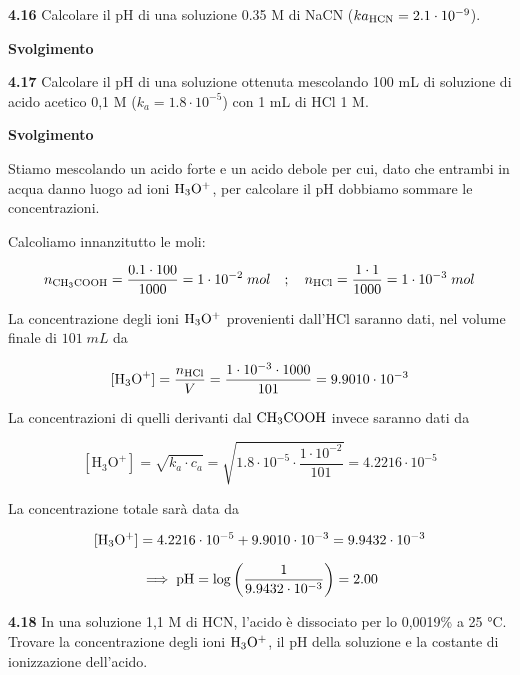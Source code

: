 \vspace{0.2cm}

\vspace{0.2cm}\textbf{4.16} Calcolare il pH di una soluzione 0.35 M di NaCN ($k{a_{\rm HCN}} = 2.1 \cdot 10^{-9}$).

\vspace{0.2cm}\large\textbf{Svolgimento}\normalsize

\vspace{0.2cm}

\vspace{0.2cm}\textbf{4.17} Calcolare il pH di una soluzione ottenuta mescolando 100 mL di soluzione di acido acetico 0,1 M ($k_a=1.8 \cdot 10^{-5}$) con 1 mL di HCl 1 M.

\vspace{0.2cm}\large\textbf{Svolgimento}\normalsize

\vspace{0.2cm}Stiamo mescolando un acido forte e un acido debole per cui, dato che entrambi in acqua danno luogo ad ioni $\rm H_3O^+$, per calcolare il pH dobbiamo sommare le concentrazioni.

Calcoliamo innanzitutto le moli:

$$n_{\rm CH_3COOH}=\frac{0.1 \cdot 100}{1000}=1 \cdot 10^{-2}\;mol
\quad;\quad
n_{\rm HCl}=\frac{1 \cdot 1}{1000}=1 \cdot 10^{-3}\;mol$$

La concentrazione degli ioni $\rm H_3O^+$ provenienti dall'HCl saranno dati, nel volume finale di $101\;mL$ da

$$[\text{H}_3\text{O}^+]=\frac{n_{\rm HCl}}{V}
=\frac{1 \cdot 10^{-3} \cdot 1000}{101}
=9.9010\cdot 10^{-3}$$

La concentrazioni di quelli derivanti dal $\rm CH_3COOH$ invece saranno dati da

$$[\text{H}_3\text{O}^+]=\sqrt{k_a \cdot c_a}
=\sqrt{1.8 \cdot 10^{-5}\cdot \frac{1 \cdot 10^{-2}}{101}}
=4.2216 \cdot 10^{-5}$$

La concentrazione totale sarà data da

$$[\rm H_3O^+]=4.2216 \cdot 10^{-5} + 9.9010\cdot 10^{-3}=9.9432 \cdot 10^{-3}$$

$$\implies
\rm pH=\log{\left(\frac{1}{9.9432 \cdot 10^{-3}}\right)}
=2.00$$

\vspace{0.2cm}\textbf{4.18}  In una soluzione 1,1 M di HCN, l'acido è dissociato per lo 0,0019\% a 25 °C. Trovare la concentrazione degli ioni $\rm H_3O^+$, il pH della soluzione e la costante di ionizzazione dell'acido. 

